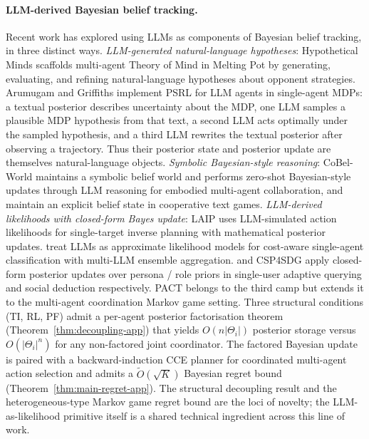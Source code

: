 \documentclass{article}
\begin{document}
\paragraph{LLM-derived Bayesian belief tracking.} Recent work has explored using LLMs as components of Bayesian belief tracking, in three distinct ways. \emph{LLM-generated natural-language hypotheses}: Hypothetical Minds \citep{cross2025hypothetical} scaffolds multi-agent Theory of Mind in Melting Pot by generating, evaluating, and refining natural-language hypotheses about opponent strategies. Arumugam and Griffiths \citep{arumugamgriffiths2026exploration} implement PSRL for LLM agents in single-agent MDPs: a textual posterior describes uncertainty about the MDP, one LLM samples a plausible MDP hypothesis from that text, a second LLM acts optimally under the sampled hypothesis, and a third LLM rewrites the textual posterior after observing a trajectory. Thus their posterior state and posterior update are themselves natural-language objects. \emph{Symbolic Bayesian-style reasoning}: CoBel-World \citep{wang2025cobel} maintains a symbolic belief world and performs zero-shot Bayesian-style updates through LLM reasoning for embodied multi-agent collaboration, and \citet{li2023tom} maintain an explicit belief state in cooperative text games. \emph{LLM-derived likelihoods with closed-form Bayes update}: LAIP \citep{gelpi2025laip} uses LLM-simulated action likelihoods for single-target inverse planning with mathematical posterior updates. \citet{amin2026bayesian} treat LLMs as approximate likelihood models for cost-aware single-agent classification with multi-LLM ensemble aggregation. \citet{mu2026adaptive} and CSP4SDG \citep{xu2025csp4sdg} apply closed-form posterior updates over persona / role priors in single-user adaptive querying and social deduction respectively. PACT belongs to the third camp but extends it to the multi-agent coordination Markov game setting. Three structural conditions (TI, RL, PF) admit a per-agent posterior factorisation theorem (Theorem~\ref{thm:decoupling-app}) that yields $O(n|\Theta_i|)$ posterior storage versus $O(|\Theta_i|^n)$ for any non-factored joint coordinator. The factored Bayesian update is paired with a backward-induction CCE planner for coordinated multi-agent action selection and admits a $\tilde O(\sqrt K)$ Bayesian regret bound (Theorem~\ref{thm:main-regret-app}). The structural decoupling result and the heterogeneous-type Markov game regret bound are the loci of novelty; the LLM-as-likelihood primitive itself is a shared technical ingredient across this line of work.
\end{document}
